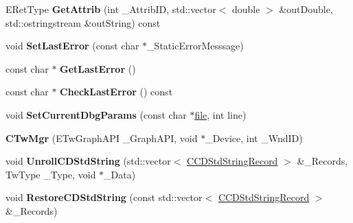 \begin{DoxyCompactItemize}
\item 
\hypertarget{struct_c_tw_mgr_ac9759e72b0799ee5649f5eed81c7a1b3}{E\+Ret\+Type {\bfseries Get\+Attrib} (int \+\_\+\+Attrib\+I\+D, std\+::vector$<$ double $>$ \&out\+Double, std\+::ostringstream \&out\+String) const }\label{struct_c_tw_mgr_ac9759e72b0799ee5649f5eed81c7a1b3}

\item 
\hypertarget{struct_c_tw_mgr_ad18067421b29a45dfda61df5677b547b}{void {\bfseries Set\+Last\+Error} (const char $\ast$\+\_\+\+Static\+Error\+Messsage)}\label{struct_c_tw_mgr_ad18067421b29a45dfda61df5677b547b}

\item 
\hypertarget{struct_c_tw_mgr_a05ec494f74824d754576dc21d4a00eb5}{const char $\ast$ {\bfseries Get\+Last\+Error} ()}\label{struct_c_tw_mgr_a05ec494f74824d754576dc21d4a00eb5}

\item 
\hypertarget{struct_c_tw_mgr_a29c6144f7a6c3ddc8617f74e1523a7f8}{const char $\ast$ {\bfseries Check\+Last\+Error} () const }\label{struct_c_tw_mgr_a29c6144f7a6c3ddc8617f74e1523a7f8}

\item 
\hypertarget{struct_c_tw_mgr_acafeb20321c00c0794fdfb02e052bacb}{void {\bfseries Set\+Current\+Dbg\+Params} (const char $\ast$\hyperlink{structfile}{file}, int line)}\label{struct_c_tw_mgr_acafeb20321c00c0794fdfb02e052bacb}

\item 
\hypertarget{struct_c_tw_mgr_a0dc2d158a640d7025388919bd6fc8d5d}{{\bfseries C\+Tw\+Mgr} (E\+Tw\+Graph\+A\+P\+I \+\_\+\+Graph\+A\+P\+I, void $\ast$\+\_\+\+Device, int \+\_\+\+Wnd\+I\+D)}\label{struct_c_tw_mgr_a0dc2d158a640d7025388919bd6fc8d5d}

\item 
\hypertarget{struct_c_tw_mgr_a2cea04385a917bc217bc823e697c4b9e}{void {\bfseries Unroll\+C\+D\+Std\+String} (std\+::vector$<$ \hyperlink{struct_c_tw_mgr_1_1_c_c_d_std_string_record}{C\+C\+D\+Std\+String\+Record} $>$ \&\+\_\+\+Records, Tw\+Type \+\_\+\+Type, void $\ast$\+\_\+\+Data)}\label{struct_c_tw_mgr_a2cea04385a917bc217bc823e697c4b9e}

\item 
\hypertarget{struct_c_tw_mgr_a27b2653320120a02eee1262b10bdd845}{void {\bfseries Restore\+C\+D\+Std\+String} (const std\+::vector$<$ \hyperlink{struct_c_tw_mgr_1_1_c_c_d_std_string_record}{C\+C\+D\+Std\+String\+Record} $>$ \&\+\_\+\+Records)}\label{struct_c_tw_mgr_a27b2653320120a02eee1262b10bdd845}


\end{DoxyCompactItemize}
